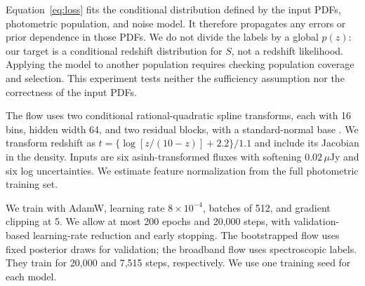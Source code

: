 Equation~\ref{eq:loss} fits the conditional distribution defined by the
input PDFs, photometric population, and noise model. It therefore propagates
any errors or prior dependence in those PDFs. We do not divide the labels
by a global $p(z)$: our target is a conditional redshift distribution for
$S$, not a redshift likelihood. Applying the model to another population
requires checking population coverage and selection. This experiment tests
neither the sufficiency assumption nor the correctness of the input PDFs.

The flow uses two conditional rational-quadratic spline transforms, each
with 16 bins, hidden width 64, and two residual blocks, with a standard-normal
base \citep{durkan2019}. We transform redshift as
$t=\{\log[z/(10-z)]+2.2\}/1.1$ and include its Jacobian in the density.
Inputs are six asinh-transformed fluxes with softening $0.02\,\mu$Jy and
six log uncertainties. We estimate feature normalization from the full
photometric training set.

We train with AdamW, learning rate $8\times10^{-4}$, batches of 512,
and gradient clipping at 5. We allow at most 200 epochs and 20,000 steps,
with validation-based learning-rate reduction and early stopping.
The bootstrapped flow uses fixed posterior draws for validation; the
broadband flow uses spectroscopic labels. They train for 20,000 and
7,515 steps, respectively. We use one training seed for each model.
